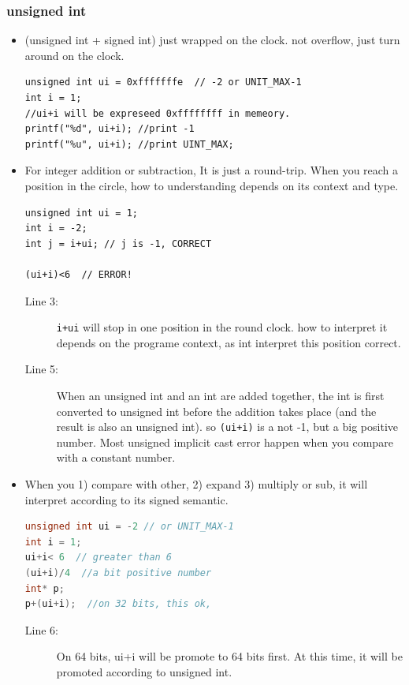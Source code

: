 \documentclass[a4paper,11pt,twoside]{book}
\begin{document}
\subsubsection{unsigned int}
\begin{itemize}
	\item (unsigned int + signed int) just wrapped on the clock. not overflow, just turn around on the clock. 
	
\begin{lstlisting}[numbers=none]
unsigned int ui = 0xfffffffe  // -2 or UNIT_MAX-1
int i = 1;
//ui+i will be expreseed 0xffffffff in memeory. 
printf("%d", ui+i); //print -1
printf("%u", ui+i); //print UINT_MAX;
\end{lstlisting}

	\item For integer addition or subtraction, It is just a round-trip. When you reach a position in the circle, how to understanding depends on its context and type.
\begin{lstlisting}
unsigned int ui = 1;
int i = -2;
int j = i+ui; // j is -1, CORRECT

(ui+i)<6  // ERROR!
\end{lstlisting}

\begin{description}
	\item[Line 3:] \texttt{i+ui} will stop in one position in the round clock. how to interpret it depends on the programe context, as int interpret this position correct.

	\item[Line 5:]  When an unsigned int and an int are added together, the int is first converted to unsigned int before the addition takes place (and the result is also an unsigned int). so \texttt{(ui+i)} is a not -1, but a big positive number. Most unsigned implicit cast error happen when you compare with a constant number.

\end{description}
	
	\item When you 1) compare with other, 2) expand 3) multiply or sub, it will interpret according to its signed semantic. 
\begin{lstlisting}[frame=single, language=c++]
unsigned int ui = -2 // or UNIT_MAX-1
int i = 1;
ui+i< 6  // greater than 6
(ui+i)/4  //a bit positive number
int* p;
p+(ui+i);  //on 32 bits, this ok, 
\end{lstlisting}
\begin{description}
	\item[Line 6:] On 64 bits, ui+i will be promote to 64 bits first. At this time, it will be promoted according to unsigned int.
\end{description}
	

\end{itemize}
\end{document}

